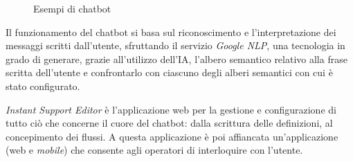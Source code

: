 \begin{figure}
    \centering{}
    \qquad
    \caption{Esempi di chatbot}
    \label{fig:chatbot-types}
\end{figure}

Il funzionamento del chatbot si basa sul riconoscimento e l'interpretazione dei messaggi scritti dall'utente, sfruttando il servizio \textit{Google NLP}, una tecnologia in grado di generare, grazie all'utilizzo dell'IA, l'albero semantico relativo alla frase scritta dell'utente e confrontarlo con ciascuno degli alberi semantici con cui è stato configurato.

\textit{Instant Support Editor} è l'applicazione web per la gestione e configurazione di tutto ciò che concerne il cuore del chatbot: dalla scrittura delle definizioni, al concepimento dei flussi.
%
A questa applicazione è poi affiancata un'applicazione (web e \textit{mobile}) che consente agli operatori di interloquire con l'utente.


